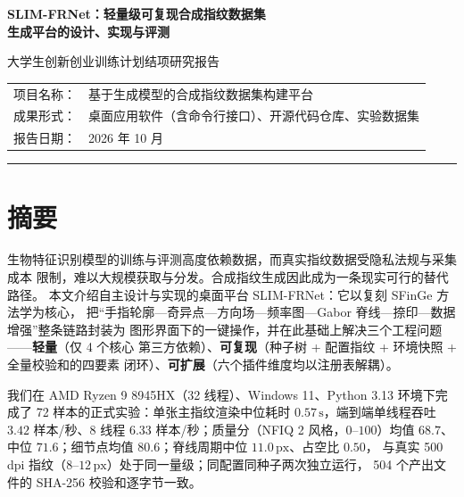 \documentclass[UTF8, fontset=windows, a4paper, 11pt]{ctexart}
\newcommand{\name}{SLIM-FRNet}
\newcommand{\px}{\,\mathrm{px}}
\newcommand{\unit}[1]{\,\mathrm{#1}}
\begin{document}
\begin{center}
    {\LARGE\bfseries \name{}：轻量级可复现合成指纹数据集\\[2pt]
     生成平台的设计、实现与评测\par}
    \vspace{6pt}
    {\large 大学生创新创业训练计划\quad 结项研究报告\par}
\end{center}

\vspace{2pt}
\begin{center}
\begin{tabular}{rl}
    项目名称： & 基于生成模型的合成指纹数据集构建平台 \\
    成果形式： & 桌面应用软件（含命令行接口）、开源代码仓库、实验数据集 \\
    报告日期： & 2026 年 10 月 \\
\end{tabular}
\end{center}

\vspace{4pt}
\begin{center}\rule{0.9\textwidth}{0.4pt}\end{center}

\section*{摘\quad 要}

生物特征识别模型的训练与评测高度依赖数据，而真实指纹数据受隐私法规与采集成本
限制，难以大规模获取与分发。合成指纹生成因此成为一条现实可行的替代路径。
本文介绍自主设计与实现的桌面平台 \name{}：它以复刻 SFinGe 方法学为核心，
把``手指轮廓—奇异点—方向场—频率图—Gabor 脊线—捺印—数据增强''整条链路封装为
图形界面下的一键操作，并在此基础上解决三个工程问题——\textbf{轻量}（仅 4 个核心
第三方依赖）、\textbf{可复现}（种子树 + 配置指纹 + 环境快照 + 全量校验和的四要素
闭环）、\textbf{可扩展}（六个插件维度均以注册表解耦）。

我们在 AMD Ryzen 9 8945HX（32 线程）、Windows 11、Python 3.13 环境下完成了
72 样本的正式实验：单张主指纹渲染中位耗时 $0.57\unit{s}$，端到端单线程吞吐
$3.42$ 样本/秒、8 线程 $6.33$ 样本/秒；质量分（NFIQ 2 风格，$0$--$100$）均值
$68.7$、中位 $71.6$；细节点均值 $80.6$；脊线周期中位 $11.0\px$、占空比 $0.50$，
与真实 500\,dpi 指纹（$8$--$12\px$）处于同一量级；同配置同种子两次独立运行，
504 个产出文件的 SHA-256 校验和逐字节一致。
\end{document}
